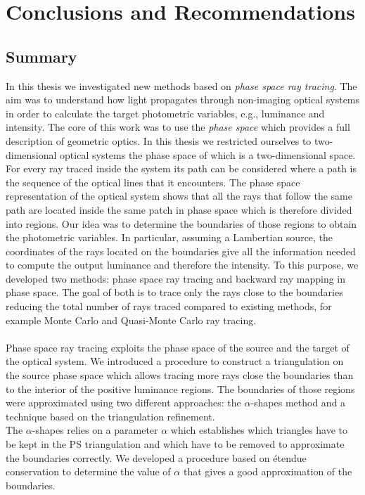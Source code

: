 \chapter{Conclusions and Recommendations}\label{chap:conclusions}
\section{Summary}
In this thesis we investigated new methods based on \textit{phase space ray tracing}. The aim was to understand how light propagates through non-imaging optical systems in order to calculate the target photometric variables, e.g., luminance and intensity. 
The core of this work was to use the \textit{phase space} which provides a full description of geometric optics. In this thesis we restricted ourselves to two-dimensional optical systems the phase space of which is a two-dimensional space. For every ray traced inside the system its path can be considered where a path is the sequence of the optical lines that it encounters. The phase space representation of the optical system shows that all the rays that follow the same path are located inside the same patch in phase space which is therefore divided into regions. Our idea was to determine the boundaries of those regions to obtain the photometric variables. In particular, assuming a Lambertian source, the coordinates of the rays located on the boundaries give all the information needed to compute the output luminance and therefore the intensity.
To this purpose, we developed two methods: phase space ray tracing and backward ray mapping in phase space. The goal of both is to trace only the rays close to the boundaries reducing the total number of rays traced compared to existing methods, for example Monte Carlo and Quasi-Monte Carlo ray tracing.
\\ \\ \indent Phase space ray tracing exploits the phase space of the source and the target of the optical system. %
We introduced a procedure to construct a triangulation on the source phase space which allows tracing more rays close the boundaries than to the interior of the positive luminance regions. 
The boundaries of those regions were approximated using two different approaches: the $\alpha$-shapes method and a technique based on the triangulation refinement. \\ \indent 
The $\alpha$-shapes relies on a parameter $\alpha$ which establishes which triangles have to be kept in the PS triangulation and which have to be removed to approximate the boundaries correctly. We developed a procedure based on \'{e}tendue conservation to determine the value of $\alpha$ that gives a good approximation of the boundaries.
